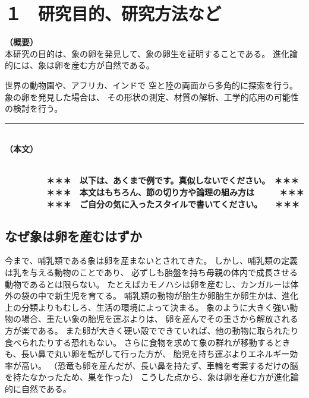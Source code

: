 \documentclass[11pt,a4j,dvipdfmx]{jarticle} 					%
\newcommand{\研究課題名}{象の卵}
\newcommand{\研究機関名}{逢坂大学}
\newcommand{\研究代表者氏名}{湯川秀樹}
\newcommand{\研究期間の最終元号年度}{8}  %
\begin{document}

\section{１　研究目的、研究方法など}

\noindent
\textbf{（概要）}\\
本研究の目的は、象の卵を発見して、象の卵生を証明することである。
進化論的には、象は卵を産む方が自然である。

	世界の動物園や、アフリカ、インドで
	空と陸の両面から多角的に探索を行う。
	象の卵を発見した場合は、
	その形状の測定、材質の解析、工学的応用の可能性の検討を行う。
\vspace*{7zw} %
	

\noindent
\rule{\linewidth}{1pt}\\
\noindent
\textbf{（本文）}
\JSPSInstructions	%

\textbf{\\　　　　　＊＊＊　以下は、あくまで例です。真似しないでください。　＊＊＊\\
　　　　　＊＊＊　本文はもちろん、節の切り方や論理の組み方は　　　＊＊＊\\
　　　　　＊＊＊　ご自分の気に入ったスタイルで書いてください。　　＊＊＊}

\subsection{なぜ象は卵を産むはずか}
今まで、哺乳類である象は卵を産まないとされてきた。
しかし、哺乳類の定義は乳を与える動物のことであり、
必ずしも胎盤を持ち母親の体内で成長させる動物であるとは限らない。
たとえばカモノハシは卵を産むし、カンガルーは体外の袋の中で新生児を育てる。
哺乳類の動物が胎生か卵胎生か卵生かは、進化上の分類よりもむしろ、生活の環境によって決まる。
象のように大きく強い動物の場合、重たい象の胎児を運ぶよりは、
卵を産んでその重さから解放される方が楽である。
また卵が大きく硬い殻でできていれば、他の動物に取られたり食べられたりする恐れもない。
さらに食物を求めて象の群れが移動するときも、長い鼻で丸い卵を転がして行った方が、
胎児を持ち運ぶよりエネルギー効率が高い。
（恐竜も卵を産んだが、長い鼻を持たず、車輪を考案するだけの脳を持たなかったため、巣を作った）
こうした点から、象は卵を産む方が進化論的に自然である。
\end{document}
